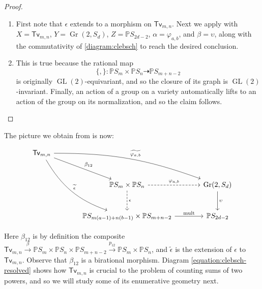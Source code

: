 \documentclass[reqno, 11pt]{amsart}
\theoremstyle{plain}
\theoremstyle{remark}
\renewcommand{\P}{\mathbb{P}}
\DeclareMathOperator{\Gr}{Gr}
\DeclareMathOperator{\GL}{GL}
\newcommand{\transvectant}{\mathsf{Tv}}
\DeclareMathOperator{\mult}{mult}
\begin{document}
\begin{proof} 
    \begin{enumerate} 
        \item First note that $\epsilon$ extends to a morphism on $\transvectant_{m,n}$. Next we apply  with $X = \transvectant_{m,n}$, $Y = \Gr(2,S_{d})$, $Z = \P S_{2d-2}$, $\alpha = \varphi_{a,b}$, and $\beta = \upsilon$, along with the commutativity of \eqref{diagram:clebsch} to reach the desired conclusion. 
       
        \item This is true because the rational map $$\{,\}:\P S_{m} \times \P S_{n} \dashrightarrow \P S_{m+n-2}$$ is originally $\GL(2)$-equivariant, and so the closure of its graph is $\GL(2)$-invariant.  Finally, an action of a group on a variety automatically lifts to an action of the group on its normalization, and so the claim follows.
    \end{enumerate}
\end{proof}

The picture we obtain from  is now:

\begin{center}
    \begin{equation}\label{equation:clebsch-resolved}
    \begin{tikzcd}[row sep=large, column sep=large]
        \transvectant_{m,n} \arrow[from=1-1, to=2-2, "\beta_{12}"] \arrow[from=1-1, to=2-3, "\widetilde{\varphi_{a,b}}", bend left = 10] \arrow[from=1-1, to=3-2, "\widetilde{\epsilon}", bend right = 20] &  & \\
    & \P S_{m} \times \P S_{n} \arrow[r, "\varphi_{a,b}", dashed] \arrow[d, "\epsilon", dashed] & \Gr(2,S_{d}) \arrow[d, "\upsilon"]\\
        & \P S_{m(a-1) + n(b-1)} \times \P S_{m+n-2} \arrow[r, "\mult"] & \P S_{2d-2}
    \end{tikzcd}
    \end{equation}
\end{center}

Here $\beta_{12}$ is by definition the composite $\transvectant_{m,n} \xrightarrow{\beta} \P S_{m} \times \P S_{n} \times \P S_{m+n-2} \xrightarrow{p_{12}} \P S_{m} \times \P S_{n}$, and $\widetilde{\epsilon}$ is the extension of $\epsilon$ to $\transvectant_{m,n}$.  Observe that $\beta_{12}$ is a birational morphism.  Diagram \eqref{equation:clebsch-resolved} shows how $\transvectant_{m,n}$ is crucial to the problem of counting sums of two powers, and so we will study some of its enumerative geometry next.
\end{document}
